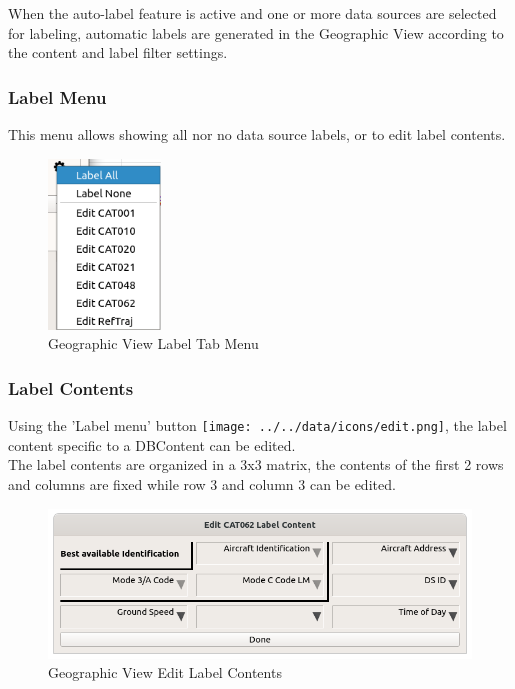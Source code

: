 When the auto-label feature is active and one or more data sources are selected for labeling, automatic labels are generated in the Geographic View according to the content and label filter settings. \\

\subsubsection{Label Menu}

This menu allows showing all nor no data source labels, or to edit label contents.

\begin{figure}[H]
   \center
    \includegraphics[width=3cm,frame]{figures/geoview_label_tab_menu.png}
  \caption{Geographic View Label Tab Menu}
\end{figure}

\subsubsection{Label Contents}

Using the 'Label menu' button \texttt{[image: ../../data/icons/edit.png]}, the label content specific to a DBContent can be edited. \\

The label contents are organized in a 3x3 matrix, the contents of the first 2 rows and columns are fixed while row 3 and column 3 can be edited. 

\begin{figure}[H]
   \center
    \includegraphics[width=14cm]{figures/geoview_label_content_edit.png}
  \caption{Geographic View Edit Label Contents}
\end{figure}

